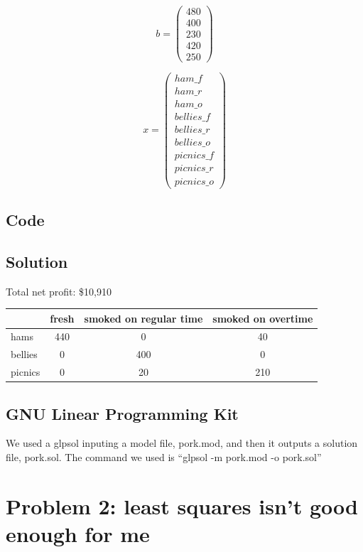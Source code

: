 \documentclass[a4paper,10pt]{article}
\begin{document}
	\[ b = \left( \begin{array}{c}
	480\\
	400\\
	230\\
	420\\
	250
	\end{array} \right)\]
	

	\[ x = \left( \begin{array}{c}
	ham\_f\\
	ham\_r\\
	ham\_o\\
	bellies\_f\\
	bellies\_r\\
	bellies\_o\\
	picnics\_f\\
	picnics\_r\\
	picnics\_o
	\end{array} \right)\]

	\subsection{Code}
	      

	\newpage
	\subsection{Solution}
	Total net profit: \$10,910\\
	\begin{tabular}{lccc}
\hline
	& fresh & smoked on regular time & smoked on overtime\\
\hline
	hams & 440 & 0 & 40\\
	bellies & 0 & 400 & 0\\
	picnics & 0 & 20 & 210
	\end{tabular}
	

	\subsection{GNU Linear Programming Kit}
	      We used a glpsol inputing a model file, pork.mod, and then it outputs a solution file, pork.sol.  The command we used is ``glpsol -m pork.mod -o pork.sol''



	\section{Problem 2: least squares isn’t good enough for me}
		
\end{document}
